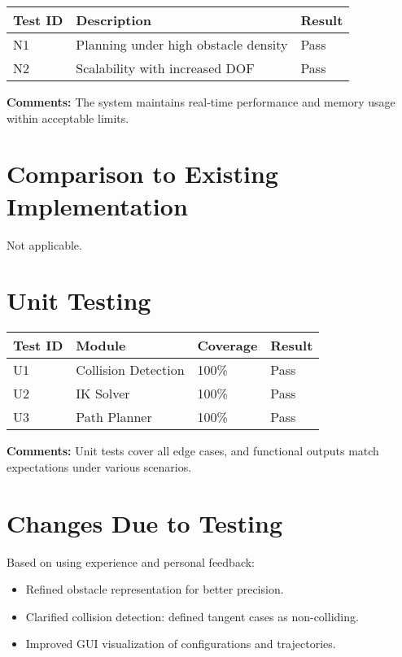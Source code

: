 \documentclass[12pt, titlepage]{article}
\begin{document}
\begin{tabularx}{\textwidth}{l X l}
\toprule
\textbf{Test ID} & \textbf{Description} & \textbf{Result} \\
\midrule
N1 & Planning under high obstacle density & Pass \\
N2 & Scalability with increased DOF & Pass \\
\bottomrule
\end{tabularx}

\textbf{Comments:} The system maintains real-time performance and memory usage within acceptable limits.

\section{Comparison to Existing Implementation}

Not applicable.

\section{Unit Testing}

\begin{tabularx}{\textwidth}{l l l l}
\toprule
\textbf{Test ID} & \textbf{Module} & \textbf{Coverage} & \textbf{Result} \\
\midrule
U1 & Collision Detection & 100\% & Pass \\
U2 & IK Solver & 100\% & Pass \\
U3 & Path Planner & 100\% & Pass \\
\bottomrule
\end{tabularx}

\textbf{Comments:} Unit tests cover all edge cases, and functional outputs match expectations under various scenarios.

\section{Changes Due to Testing}

Based on using experience and personal feedback:

\begin{itemize}
  \item Refined obstacle representation for better precision.
  \item Clarified collision detection: defined tangent cases as non-colliding.
  \item Improved GUI visualization of configurations and trajectories.
\end{itemize}
\end{document}
